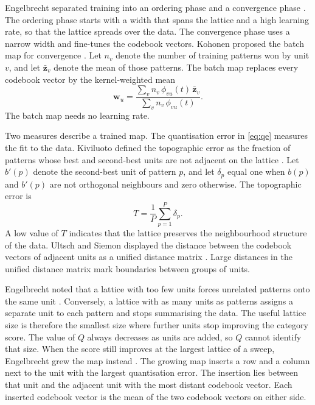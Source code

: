 \documentclass[conference,10pt]{IEEEtran}
\begin{document}
Engelbrecht separated training into an ordering phase and a convergence phase \cite{engelbrecht2007}.
The ordering phase starts with a width that spans the lattice and a high learning rate, so that the lattice spreads over the data.
The convergence phase uses a narrow width and fine-tunes the codebook vectors.
Kohonen proposed the batch map for convergence \cite{kohonen2001}.
Let $n_v$ denote the number of training patterns won by unit $v$, and let $\bar{\mathbf{z}}_v$ denote the mean of those patterns.
The batch map replaces every codebook vector by the kernel-weighted mean
\begin{equation}
\mathbf{w}_u=\frac{\sum_{v}n_v\,\phi_{vu}(t)\,\bar{\mathbf{z}}_v}{\sum_{v}n_v\,\phi_{vu}(t)}.
\label{eq:batch}
\end{equation}
The batch map needs no learning rate.

Two measures describe a trained map.
The quantisation error in \eqref{eq:qe} measures the fit to the data.
Kiviluoto defined the topographic error as the fraction of patterns whose best and second-best units are not adjacent on the lattice \cite{kiviluoto1996}.
Let $b'(p)$ denote the second-best unit of pattern $p$, and let $\delta_p$ equal one when $b(p)$ and $b'(p)$ are not orthogonal neighbours and zero otherwise.
The topographic error is
\begin{equation}
T=\frac{1}{P}\sum_{p=1}^{P}\delta_p.
\label{eq:te}
\end{equation}
A low value of $T$ indicates that the lattice preserves the neighbourhood structure of the data.
Ultsch and Siemon displayed the distance between the codebook vectors of adjacent units as a unified distance matrix \cite{ultsch1990}.
Large distances in the unified distance matrix mark boundaries between groups of units.

Engelbrecht noted that a lattice with too few units forces unrelated patterns onto the same unit \cite{engelbrecht2007}.
Conversely, a lattice with as many units as patterns assigns a separate unit to each pattern and stops summarising the data.
The useful lattice size is therefore the smallest size where further units stop improving the category score.
The value of $Q$ always decreases as units are added, so $Q$ cannot identify that size.
When the score still improves at the largest lattice of a sweep, Engelbrecht grew the map instead \cite{engelbrecht2007}.
The growing map inserts a row and a column next to the unit with the largest quantisation error.
The insertion lies between that unit and the adjacent unit with the most distant codebook vector.
Each inserted codebook vector is the mean of the two codebook vectors on either side.
\end{document}
